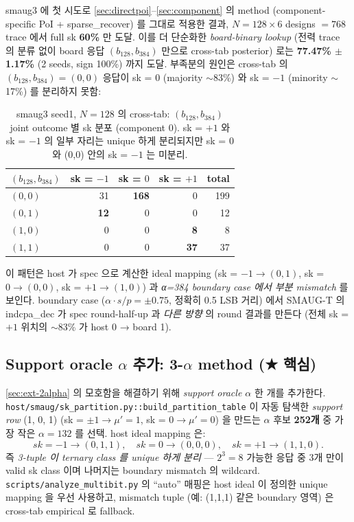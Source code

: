 \documentclass[11pt]{article}
\theoremstyle{plain}
\theoremstyle{definition}
\theoremstyle{remark}
\begin{document}
smaug3 에 첫 시도로 \cref{sec:directpoi}--\cref{sec:component} 의 method
(component-specific PoI + sparse\_recover) 를 그대로 적용한 결과, $N=128 \times
6$ designs $= 768$ trace 에서 full sk \textbf{60\%} 만 도달. 이를 더 단순화한
\emph{board-binary lookup} (전력 trace 의 분류 없이 board 응답
$(b_{128}, b_{384})$ 만으로 cross-tab posterior) 로는 \textbf{77.47\% $\pm$
1.17\%} (2 seeds, sign 100\%) 까지 도달. 부족분의 원인은 cross-tab 의
$(b_{128}, b_{384}) = (0,0)$ 응답이 sk = 0 (majority $\sim$83\%) 와 sk = $-1$
(minority $\sim$17\%) 를 분리하지 못함:

\begin{table}[h!]
\centering
\caption{smaug3 seed1, $N=128$ 의 cross-tab: $(b_{128}, b_{384})$ joint
outcome 별 sk 분포 (component 0). sk = $+1$ 와 sk = $-1$ 의 일부 자리는 unique
하게 분리되지만 sk = 0 와 (0,0) 안의 sk = $-1$ 는 미분리.}
\label{tab:smaug3-2alpha-crosstab}
\small
\begin{tabular}{lrrrr}
\toprule
$(b_{128}, b_{384})$ & sk = $-1$ & sk = $0$ & sk = $+1$ & total \\
\midrule
$(0, 0)$ & 31 & \textbf{168} & 0 & 199 \\
$(0, 1)$ & \textbf{12} & 0 & 0 & 12 \\
$(1, 0)$ & 0 & 0 & \textbf{8} & 8 \\
$(1, 1)$ & 0 & 0 & \textbf{37} & 37 \\
\bottomrule
\end{tabular}
\end{table}

이 패턴은 host 가 spec 으로 계산한 ideal mapping (sk = $-1 \to (0,1)$,
sk = $0 \to (0,0)$, sk = $+1 \to (1,0)$) 과 \emph{α=384 boundary case 에서
부분 mismatch} 를 보인다. boundary case ($\alpha \cdot s / p = \pm 0.75$,
정확히 0.5 LSB 거리) 에서 SMAUG-T 의 indcpa\_dec 가 spec round-half-up 과
\emph{다른 방향} 의 round 결과를 만든다 (전체 sk = $+1$ 위치의 $\sim$83\%
가 host 0 → board 1).

\subsection{Support oracle $\alpha$ 추가: 3-$\alpha$ method (★ 핵심)}
\label{sec:ext-3alpha}

\cref{sec:ext-2alpha} 의 모호함을 해결하기 위해 \emph{support oracle $\alpha$}
한 개를 추가한다. \texttt{host/smaug/sk\_partition.py::build\_partition\_table}
이 자동 탐색한 \emph{support row} (1, 0, 1) (sk = $\pm 1 \to \mu' = 1$,
sk = $0 \to \mu' = 0$) 을 만드는 $\alpha$ 후보 \textbf{252개} 중 가장 작은
$\alpha = 132$ 를 선택. host ideal mapping 은:
\[
\mathit{sk} = -1 \to (0, 1, 1), \quad
\mathit{sk} = 0  \to (0, 0, 0), \quad
\mathit{sk} = +1 \to (1, 1, 0).
\]
즉 \emph{3-tuple 이 ternary class 를 unique 하게 분리} — $2^3 = 8$ 가능한
응답 중 3개 만이 valid sk class 이며 나머지는 boundary mismatch 의 wildcard.
\texttt{scripts/analyze\_multibit.py} 의 ``auto'' 매핑은 host ideal 이
정의한 unique mapping 을 우선 사용하고, mismatch tuple (예: (1,1,1) 같은
boundary 영역) 은 cross-tab empirical 로 fallback.
\end{document}
